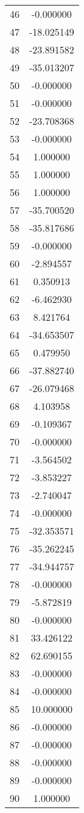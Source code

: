 \documentclass[12pt]{article}
\begin{document}
\begin{longtable}{@{}cc@{}}
46 & -0.000000 \\
47 & -18.025149 \\
48 & -23.891582 \\
49 & -35.013207 \\
50 & -0.000000 \\
51 & -0.000000 \\
52 & -23.708368 \\
53 & -0.000000 \\
54 & 1.000000 \\
55 & 1.000000 \\
56 & 1.000000 \\
57 & -35.700520 \\
58 & -35.817686 \\
59 & -0.000000 \\
60 & -2.894557 \\
61 & 0.350913 \\
62 & -6.462930 \\
63 & 8.421764 \\
64 & -34.653507 \\
65 & 0.479950 \\
66 & -37.882740 \\
67 & -26.079468 \\
68 & 4.103958 \\
69 & -0.109367 \\
70 & -0.000000 \\
71 & -3.564502 \\
72 & -3.853227 \\
73 & -2.740047 \\
74 & -0.000000 \\
75 & -32.353571 \\
76 & -35.262245 \\
77 & -34.944757 \\
78 & -0.000000 \\
79 & -5.872819 \\
80 & -0.000000 \\
81 & 33.426122 \\
82 & 62.690155 \\
83 & -0.000000 \\
84 & -0.000000 \\
85 & 10.000000 \\
86 & -0.000000 \\
87 & -0.000000 \\
88 & -0.000000 \\
89 & -0.000000 \\
90 & 1.000000 \\

\end{longtable}
\end{document}
